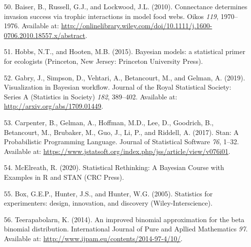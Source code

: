 \documentclass[12pt]{article}
\begin{document}
\begin{cslreferences}
\leavevmode\hypertarget{ref-BaisRuss10}{}%
50. Baiser, B., Russell, G.J., and Lockwood, J.L. (2010). Connectance
determines invasion success via trophic interactions in model food webs.
Oikos \emph{119}, 1970--1976. Available at:
\url{http://onlinelibrary.wiley.com/doi/10.1111/j.1600-0706.2010.18557.x/abstract}.

\leavevmode\hypertarget{ref-HobbHoot15}{}%
51. Hobbs, N.T., and Hooten, M.B. (2015). Bayesian models: a statistical
primer for ecologists (Princeton, New Jersey: Princeton University
Press).

\leavevmode\hypertarget{ref-GabrSimp19}{}%
52. Gabry, J., Simpson, D., Vehtari, A., Betancourt, M., and Gelman, A.
(2019). Visualization in Bayesian workflow. Journal of the Royal
Statistical Society: Series A (Statistics in Society) \emph{182},
389--402. Available at: \url{http://arxiv.org/abs/1709.01449}.

\leavevmode\hypertarget{ref-CarpGelm17}{}%
53. Carpenter, B., Gelman, A., Hoffman, M.D., Lee, D., Goodrich, B.,
Betancourt, M., Brubaker, M., Guo, J., Li, P., and Riddell, A. (2017).
Stan: A Probabilistic Programming Language. Journal of Statistical
Software \emph{76}, 1--32. Available at:
\url{https://www.jstatsoft.org/index.php/jss/article/view/v076i01}.

\leavevmode\hypertarget{ref-McEl20}{}%
54. McElreath, R. (2020). Statistical Rethinking: A Bayesian Course with
Examples in R and STAN (CRC Press).

\leavevmode\hypertarget{ref-BoxHunt05}{}%
55. Box, G.E.P., Hunter, J.S., and Hunter, W.G. (2005). Statistics for
experimenters: design, innovation, and discovery (Wiley-Interscience).

\leavevmode\hypertarget{ref-Teer14}{}%
56. Teerapabolarn, K. (2014). An improved binomial approximation for the
beta binomial distribution. International Journal of Pure and Apllied
Mathematics \emph{97}. Available at:
\url{http://www.ijpam.eu/contents/2014-97-4/10/}.
\end{cslreferences}
\end{document}
